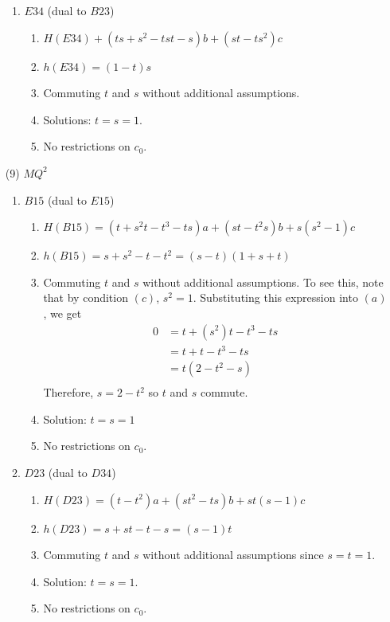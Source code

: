 \documentclass[11pt]{amsart}
\theoremstyle{definition}
\begin{document}
\begin{enumerate}
\begin{enumerate}
\item $E34$ (dual to $B23$)
            \begin{enumerate}
                \item $H(E34)+(ts+s^2-tst-s)b + (st - ts^2)c$
                \item  $h(E34) = (1-t)s$
                \item Commuting $t$ and $s$ without additional assumptions.  
                \item Solutions: $t=s=1$.
                \item No restrictions on $c_0$.
            \end{enumerate}
        \end{enumerate}

 \item[(9)] $MQ^2$
        \begin{enumerate}
            \item $B15$ (dual to $E15$)
            \begin{enumerate}
                \item  $H(B15) = (t+s^2t-t^3-ts)a+(st-t^2s)b +s(s^2-1)c$
                \item  $h(B15) = s+s^2 -t-t^2 = (s-t)(1+s+t)$ 
                \item Commuting $t$ and $s$ without additional assumptions. To see this, note that by condition $(c)$, $s^2 = 1$. Substituting this expression into $(a)$, we get 
                \begin{align*}
                    0 & = t+(s^2)t-t^3-ts \\
                    & = t+t-t^3-ts \\
                    & =t(2-t^2-s) \\
                \end{align*}
                Therefore, $s = 2-t^2$  so $t$ and $s$ commute. 
                \item Solution: $t=s=1$
                \item No restrictions on $c_0$.
            \end{enumerate}

             \item $D23$ (dual to $D34$)
            \begin{enumerate}
                \item  $H(D23) = (t-t^2)a + (st^2 -ts)b +st(s-1)c $
                \item   $h(D23) = s+st -t -s = (s-1)t$
                \item Commuting $t$ and $s$ without additional assumptions since $s=t=1$.
                \item Solution: $t=s=1$.
                \item No restrictions on $c_0$.
            \end{enumerate}


\end{enumerate}
\end{enumerate}
\end{document}
